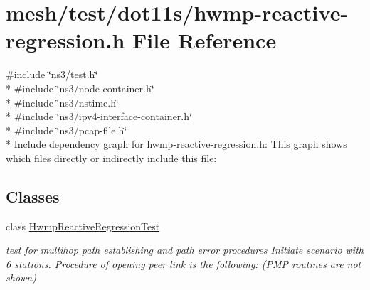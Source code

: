 \hypertarget{hwmp-reactive-regression_8h}{}\section{mesh/test/dot11s/hwmp-\/reactive-\/regression.h File Reference}
\label{hwmp-reactive-regression_8h}
{\ttfamily \#include \char`\"{}ns3/test.\+h\char`\"{}}\\*
{\ttfamily \#include \char`\"{}ns3/node-\/container.\+h\char`\"{}}\\*
{\ttfamily \#include \char`\"{}ns3/nstime.\+h\char`\"{}}\\*
{\ttfamily \#include \char`\"{}ns3/ipv4-\/interface-\/container.\+h\char`\"{}}\\*
{\ttfamily \#include \char`\"{}ns3/pcap-\/file.\+h\char`\"{}}\\*
Include dependency graph for hwmp-\/reactive-\/regression.h\+:
This graph shows which files directly or indirectly include this file\+:
\subsection*{Classes}
\begin{DoxyCompactItemize}
\item 
class \hyperlink{classHwmpReactiveRegressionTest}{Hwmp\+Reactive\+Regression\+Test}
\begin{DoxyCompactList}\small\item\em test for multihop path establishing and path error procedures Initiate scenario with 6 stations. Procedure of opening peer link is the following\+: (P\+MP routines are not shown) \end{DoxyCompactList}\end{DoxyCompactItemize}
